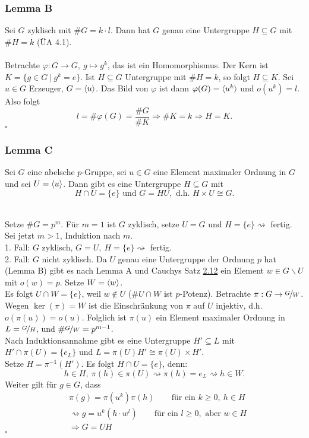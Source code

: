 \subsubsection*{Lemma B}
Sei $G$ zyklisch mit $\#G=k\cdot l$. 
Dann hat $G$ genau eine Untergruppe $H\subseteq G$ mit $\#H=k$ (ÜA 4.1).\\
\newpage
{}\\
Betrachte $\varphi:G\to G,~g\mapsto g^k$, das ist ein Homomorphismus. 
Der Kern ist $K=\{g\in G~|~g^k=e \}$. Ist $H\subseteq G$ Untergruppe mit $\#H=k$, so folgt $H\subseteq K$. 
Sei $u\in G$ Erzeuger, $G=\langle u \rangle$. 
Das Bild von $\varphi$ ist dann $\varphi(G)=\langle u^k \rangle$ und $o(u^k)=l$. 
Also folgt 
\[
l=\#\varphi(G)= \frac{\#G}{\#K} \Rightarrow \#K=k \Rightarrow H=K. 
\]
\hfill $\square$

\subsubsection*{Lemma C}
Sei $G$ eine abelsche $p$-Gruppe, sei $u\in G$ eine Element maximaler Ordnung in $G$ und sei $U=\langle u \rangle$. 
Dann gibt es eine Untergruppe $H\subseteq G$ mit
\[ 
H\cap U=\{e\} \text{ und } G=HU, \text{ d.h. } H\times U\cong G. 
\]

\\
Setze $\#G=p^m$. 
Für $m=1$
ist $G$ zyklisch, setze $U=G$ und $H=\{e\} \rightsquigarrow$ fertig.\\
Sei jetzt $m>1$, Induktion nach $m$.\\
1. Fall: $G$ zyklisch, $G=U,~H=\{e\}\rightsquigarrow$ fertig.\\
2. Fall: $G$ nicht zyklisch. Da $U$ genau eine Untergruppe der Ordnung $p$ hat (Lemma B) gibt es nach Lemma A und Cauchys Satz \hyperref[sub:cauchys_satz]{2.12} ein Element $w\in G\backslash U$ mit $o(w)=p$. 
Setze $W=\langle w \rangle$.\\
Es folgt $U\cap W=\{e\}$, weil $w\notin U$ ($\#U\cap W$ ist $p$-Potenz). 
Betrachte $\pi:G\to \nicefrac{G}{W}$. 
Wegen $\ker(\pi)=W$ ist die Einschränkung von $\pi$ auf $U$ injektiv, d.h. $o(\pi(u))=o(u)$. 
Folglich ist $\pi(u)$ ein Element maximaler Ordnung in $L=\nicefrac{G}{H}$, und $\#\nicefrac{G}{W}=p^{m-1}$.\\

Nach Induktionsannahme gibt es eine Untergruppe $H'\subseteq L$ mit $H'\cap \pi(U)=\{e_L\}$ und $L=\pi(U)H'\cong \pi(U)\times H'$.\\
Setze $H=\pi^{-1}(H')$. 
Es folgt $H\cap U=\{e\}$, denn:
\[
h\in H,~\pi(h)\in \pi(U)\rightsquigarrow \pi(h)=e_L \rightsquigarrow h\in W. 
\]
Weiter gilt für $g\in G$, dass 
\begin{equation*}
\begin{aligned}
	&\pi(g)=\pi(u^k)\pi(h)\qquad \text{für ein } k\ge 0,~h\in H\\
	&\rightsquigarrow g=u^k(h\cdot w^l)\qquad\text{für ein } l\ge 0,\text{ aber } w\in H\\
	&\Rightarrow G=UH
\end{aligned}
\end{equation*}
\hfill $\square$

